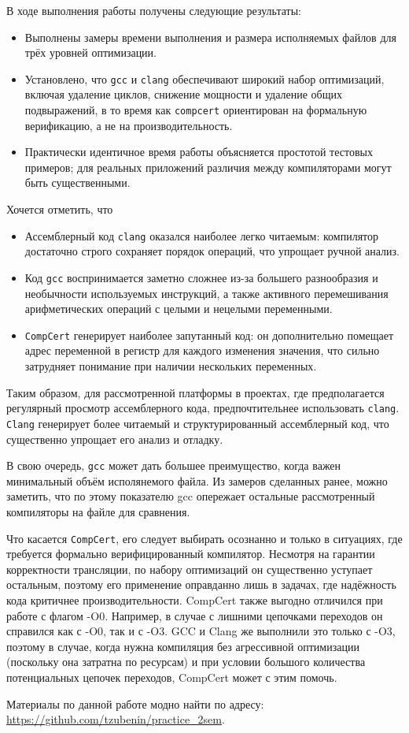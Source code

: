 \documentclass[a4paper]{article}
\begin{document}
\medskip
\noindent
В ходе выполнения работы получены следующие результаты:
\begin{itemize}
    \item Выполнены замеры времени выполнения и размера исполняемых файлов для трёх уровней оптимизации.
    \item Установлено, что \texttt{gcc} и \texttt{clang} обеспечивают широкий набор оптимизаций, включая удаление циклов, снижение мощности и удаление общих подвыражений, в то время как \texttt{compcert} ориентирован на формальную верификацию, а не на производительность.
    \item Практически идентичное время работы объясняется простотой тестовых примеров; для реальных приложений различия между компиляторами могут быть существенными.
\end{itemize}

\smallskip
\noindent
Хочется отметить, что
\begin{itemize}
    \item Ассемблерный код \texttt{clang} оказался наиболее легко читаемым: компилятор достаточно строго сохраняет порядок операций, что упрощает ручной анализ.
    \item Код \texttt{gcc} воспринимается заметно сложнее из-за большего разнообразия и необычности используемых инструкций, а также активного перемешивания арифметических операций с целыми и нецелыми переменными.
    \item \texttt{CompCert} генерирует наиболее запутанный код: он дополнительно помещает адрес переменной в регистр для каждого изменения значения, что сильно затрудняет понимание при наличии нескольких переменных.
\end{itemize}
\bigskip
\noindent
Таким образом, для рассмотренной платформы в проектах, где предполагается регулярный просмотр ассемблерного кода, предпочтительнее использовать \texttt{clang}. \texttt{Clang} генерирует более читаемый и структурированный ассемблерный код, что существенно упрощает его анализ и отладку.
\bigskip

\noindent
В свою очередь, \texttt{gcc} может дать большее преимущество, когда важен минимальный объём исполянемого файла. Из замеров сделанных ранее, можно заметить, что по этому показателю gcc опережает остальные рассмотренный компиляторы на файле для сравнения.
\bigskip

\noindent
Что касается \texttt{CompCert}, его следует выбирать осознанно и только в ситуациях, где требуется формально верифицированный компилятор. Несмотря на гарантии корректности трансляции, по набору оптимизаций он существенно уступает остальным, поэтому его применение оправданно лишь в задачах, где надёжность кода критичнее производительности. CompCert также выгодно отличился при работе с флагом -O0. Например, в случае с лишними цепочками переходов он справился как с -O0, так и с -O3. GCC и Clang же выполнили это только с -O3, поэтому в случае, когда нужна компиляция без агрессивной оптимизации (поскольку она затратна по ресурсам) и при условии большого количества потенциальных цепочек переходов, CompCert может с этим помочь.
\bigskip

\noindent
Материалы по данной работе модно найти по адресу: \url{https://github.com/tzubenin/practice_2sem}.
\end{document}
